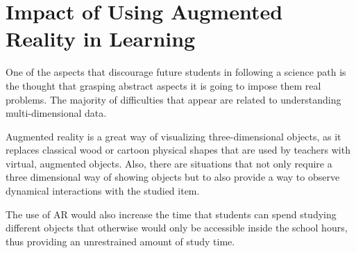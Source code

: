 \documentclass[12 pct]{report}
\begin{document}
\section{Impact of Using Augmented Reality in Learning}
One of the aspects that discourage future students in following a science path is the thought that grasping abstract aspects it is going to impose them real problems. The majority of difficulties that appear are related to understanding multi-dimensional data.

Augmented reality is a great way of visualizing three-dimensional objects, as it replaces classical wood or cartoon physical shapes that are used by teachers with virtual, augmented objects. Also, there are situations that not only require a three dimensional way of showing objects but to also provide a way to observe dynamical interactions with the studied item.

The use of AR would also increase the time that students can spend studying different objects that otherwise would only be accessible inside the school hours, thus providing an unrestrained amount of study time.
\end{document}
